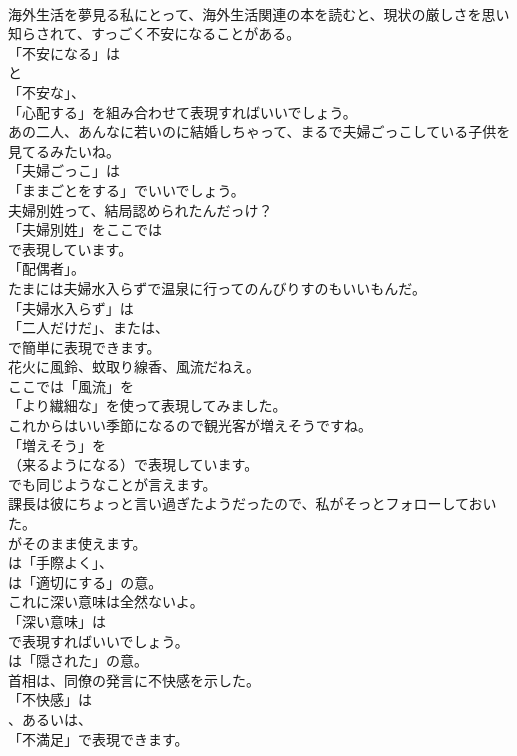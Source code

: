 \documentclass[8pt]{extreport}
\begin{document}
\begin{CJK}{UTF8}{min}
\\	海外生活を夢見る私にとって、海外生活関連の本を読むと、現状の厳しさを思い知らされて、すっごく不安になることがある。 
\\	「不安になる」は
\\	と
\\	「不安な」、
\\	「心配する」を組み合わせて表現すればいいでしょう。	
\\	あの二人、あんなに若いのに結婚しちゃって、まるで夫婦ごっこしている子供を見てるみたいね。 
\\	「夫婦ごっこ」は
\\	「ままごとをする」でいいでしょう。	
\\	夫婦別姓って、結局認められたんだっけ？ 
\\	「夫婦別姓」をここでは
\\	で表現しています。
\\	「配偶者」。	
\\	たまには夫婦水入らずで温泉に行ってのんびりすのもいいもんだ。 
\\	「夫婦水入らず」は
\\	「二人だけだ」、または、
\\	で簡単に表現できます。	
\\	花火に風鈴、蚊取り線香、風流だねえ。 
\\	ここでは「風流」を
\\	「より繊細な」を使って表現してみました。	
\\	これからはいい季節になるので観光客が増えそうですね。 
\\	「増えそう」を 
\\	（来るようになる）で表現しています。
\\	でも同じようなことが言えます。	
\\	課長は彼にちょっと言い過ぎたようだったので、私がそっとフォローしておいた。 
\\	がそのまま使えます。
\\	は「手際よく」、
\\	は「適切にする」の意。	
\\	これに深い意味は全然ないよ。 
\\	「深い意味」は 
\\	で表現すればいいでしょう。
\\	は「隠された」の意。	
\\	首相は、同僚の発言に不快感を示した。 
\\	「不快感」は
\\	、あるいは、
\\	「不満足」で表現できます。

\end{CJK}
\end{document}

